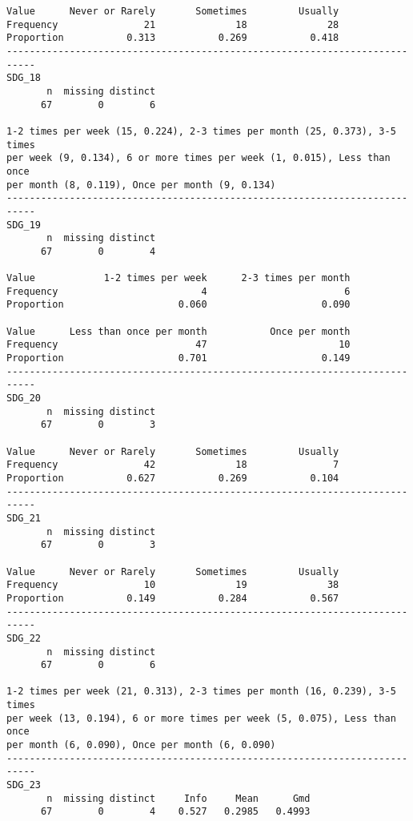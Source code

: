 \documentclass[]{article}
\begin{document}
\begin{verbatim}
Value      Never or Rarely       Sometimes         Usually
Frequency               21              18              28
Proportion           0.313           0.269           0.418
---------------------------------------------------------------------------
SDG_18 
       n  missing distinct 
      67        0        6 

1-2 times per week (15, 0.224), 2-3 times per month (25, 0.373), 3-5 times
per week (9, 0.134), 6 or more times per week (1, 0.015), Less than once
per month (8, 0.119), Once per month (9, 0.134)
---------------------------------------------------------------------------
SDG_19 
       n  missing distinct 
      67        0        4 
                                                            
Value            1-2 times per week      2-3 times per month
Frequency                         4                        6
Proportion                    0.060                    0.090
                                                            
Value      Less than once per month           Once per month
Frequency                        47                       10
Proportion                    0.701                    0.149
---------------------------------------------------------------------------
SDG_20 
       n  missing distinct 
      67        0        3 
                                                          
Value      Never or Rarely       Sometimes         Usually
Frequency               42              18               7
Proportion           0.627           0.269           0.104
---------------------------------------------------------------------------
SDG_21 
       n  missing distinct 
      67        0        3 
                                                          
Value      Never or Rarely       Sometimes         Usually
Frequency               10              19              38
Proportion           0.149           0.284           0.567
---------------------------------------------------------------------------
SDG_22 
       n  missing distinct 
      67        0        6 

1-2 times per week (21, 0.313), 2-3 times per month (16, 0.239), 3-5 times
per week (13, 0.194), 6 or more times per week (5, 0.075), Less than once
per month (6, 0.090), Once per month (6, 0.090)
---------------------------------------------------------------------------
SDG_23 
       n  missing distinct     Info     Mean      Gmd 
      67        0        4    0.527   0.2985   0.4993 
                                  

\end{verbatim}
\end{document}
